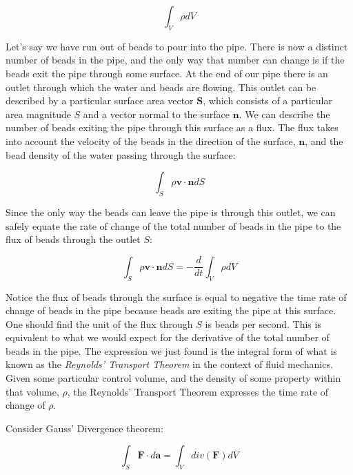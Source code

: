 \documentclass[twocolumn,12pth]{article}
\begin{document}
\begin{equation}
\int_{V} \rho dV
\end{equation}

Let's say we have run out of beads to pour into the pipe.
There is now a distinct number of beads in the pipe, and the only way that number can change is if the beads exit the pipe through some surface.
At the end of our pipe there is an outlet through which the water and beads are flowing.
This outlet can be described by a particular surface area vector $\mathbf{S}$, which consists of a particular area magnitude $S$ and a vector normal to the surface $\mathbf{n}$.
We can describe the number of beads exiting the pipe through this surface as a flux.
The flux takes into account the velocity of the beads in the direction of the surface, $\mathbf{n}$, and the bead density of the water passing through the surface:

\begin{equation}
\int_S \rho \mathbf{v} \cdot \mathbf{n} dS
\end{equation}

Since the only way the beads can leave the pipe is through this outlet, we can safely equate the rate of change of the total number of beads in the pipe to the flux of beads through the outlet $S$:

\begin{equation}
\int_S \rho \mathbf{v} \cdot \mathbf{n} dS = - \frac{d}{dt} \int_{V} \rho dV
\label{eq:rtt}
\end{equation}

Notice the flux of beads through the surface is equal to negative the time rate of change of beads in the pipe because beads are exiting the pipe at this surface.
One should find the unit of the flux through $S$ is beads per second.
This is equivalent to what we would expect for the derivative of the total number of beads in the pipe.
The expression we just found is the integral form of what is known as the \textit{Reynolds' Transport Theorem} in the context of fluid mechanics.
Given some particular control volume, and the density of some property within that volume, $\rho$, the Reynolds' Transport Theorem expresses the time rate of change of $\rho$.

Consider Gauss' Divergence theorem:

\begin{equation}
\int_S \mathbf{F} \cdot d\mathbf{a} = \int_V div(\mathbf{F}) dV
\end{equation}
\end{document}
